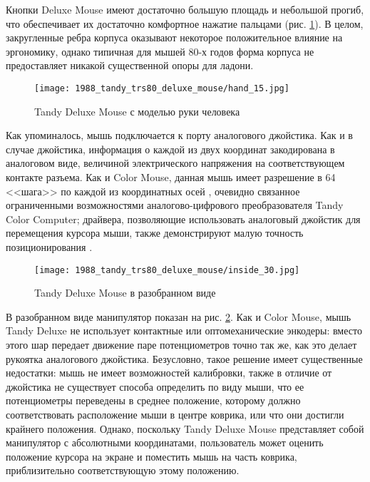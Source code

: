 \documentclass[11pt, a4paper]{article}
\begin{document}
Кнопки Deluxe Mouse имеют достаточно большую площадь и небольшой прогиб, что обеспечивает их достаточно комфортное нажатие пальцами (рис. \ref{fig:TandyDeluxeMouseHand}). В целом, закругленные ребра корпуса оказывают некоторое положительное влияние на эргономику, однако типичная для мышей 80-х годов форма корпуса не предоставляет никакой существенной опоры для ладони.

\begin{figure}[h]
    \centering
    \texttt{[image: 1988\_tandy\_trs80\_deluxe\_mouse/hand\_15.jpg]}
    \caption{Tandy Deluxe Mouse с моделью руки человека}
    \label{fig:TandyDeluxeMouseHand}
\end{figure}

Как упоминалось, мышь подключается к порту аналогового джойстика. Как и в случае джойстика, информация о каждой из двух координат закодирована в аналоговом виде, величиной электрического напряжения на соответствующем контакте разъема. Как и Color Mouse, данная мышь имеет разрешение в 64 <<шага>> по каждой из координатных осей \cite{manual}, очевидно связанное ограниченными возможностями аналогово-цифрового преобразователя Tandy Color Computer; драйвера, позволяющие использовать аналоговый джойстик для перемещения курсора мыши, также демонстрируют малую точность позиционирования \cite{hierophant}.

\begin{figure}[h]
    \centering
    \texttt{[image: 1988\_tandy\_trs80\_deluxe\_mouse/inside\_30.jpg]}
    \caption{Tandy Deluxe Mouse в разобранном виде}
    \label{fig:TandyDeluxeMouseInside}
\end{figure}

В разобранном виде манипулятор показан на рис. \ref{fig:TandyDeluxeMouseInside}. Как и Color Mouse, мышь Tandy Deluxe не использует контактные или оптомеханические энкодеры: вместо этого шар передает движение паре потенциометров точно так же, как это делает рукоятка аналогового джойстика. Безусловно, такое решение имеет существенные недостатки: мышь не имеет возможностей калибровки, также в отличие от джойстика не существует способа определить по виду мыши, что ее потенциометры переведены в среднее положение, которому должно соответствовать расположение мыши в центре коврика, или что они достигли крайнего положения. Однако, поскольку Tandy Deluxe Mouse представляет собой манипулятор с абсолютными координатами, пользователь может оценить положение курсора на экране и поместить мышь на часть коврика, приблизительно соответствующую этому положению.
\end{document}
